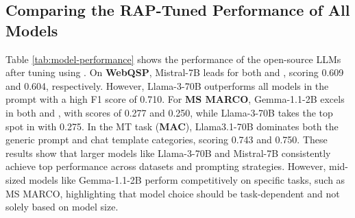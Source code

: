 % 
% 
% 

\subsection{Comparing the RAP-Tuned Performance of All Models}
Table \ref{tab:model-performance} shows the performance of the open-source LLMs after tuning \rpp using \rap. 
On \textbf{WebQSP}, Mistral-7B leads for both \raggen and \ragtem, scoring 0.609 and 0.604, respectively. However, Llama-3-70B outperforms all models in the \nonrag prompt with a high F1 score of 0.710. 
For \textbf{MS MARCO}, Gemma-1.1-2B excels in both \ragtem and \nonrag, with scores of 0.277 and 0.250, while Llama-3-70B takes the top spot in \raggen with 0.275.
In the MT task (\textbf{MAC}), Llama3.1-70B dominates both the generic prompt and chat template categories, scoring 0.743 and 0.750.
These results show that larger models like Llama-3-70B and Mistral-7B consistently achieve top performance across datasets and prompting strategies. However, mid-sized models like Gemma-1.1-2B perform competitively on specific tasks, such as MS MARCO, highlighting that model choice should be task-dependent and not solely based on model size.




